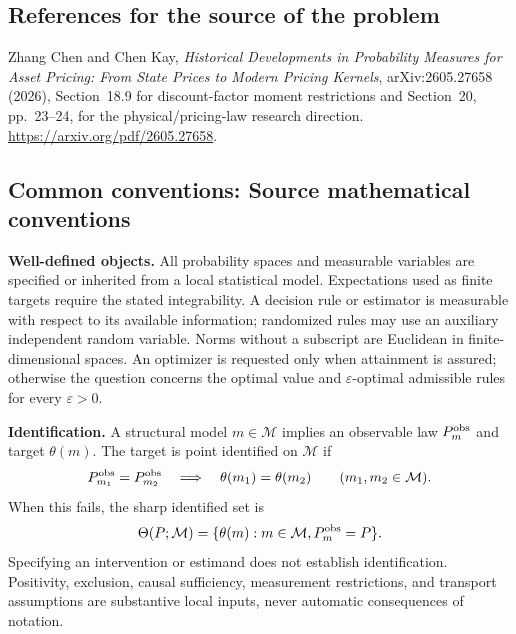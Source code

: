 \documentclass[11pt,a4paper]{article}
\begin{document}
\subsection*{References for the source of the problem}
Zhang Chen and Chen Kay, \emph{Historical Developments in Probability Measures for Asset Pricing: From State Prices to Modern Pricing Kernels}, arXiv:2605.27658 (2026), Section~18.9 for discount-factor moment restrictions and Section~20, pp.~23--24, for the physical/pricing-law research direction. \url{https://arxiv.org/pdf/2605.27658}.

\subsection*{Common conventions: Source mathematical conventions}

\textbf{Well-defined objects.}
All probability spaces and measurable variables are specified or inherited
from a local statistical model. Expectations used as finite targets require
the stated integrability. A decision rule or estimator is measurable with
respect to its available information; randomized rules may use an auxiliary
independent random variable. Norms without a subscript are Euclidean in
finite-dimensional spaces. An optimizer is requested only when attainment
is assured; otherwise the question concerns the optimal value and
$\varepsilon$-optimal admissible rules for every $\varepsilon>0$.

\textbf{Identification.}
A structural model $m\in\mathcal M$ implies an observable law
$P_m^{\rm obs}$ and target $\theta(m)$. The target is point identified on
$\mathcal M$ if
\[
 P_{m_1}^{\rm obs}=P_{m_2}^{\rm obs}
 \quad\Longrightarrow\quad\theta(m_1)=\theta(m_2)
 \qquad(m_1,m_2\in\mathcal M).
\]
When this fails, the sharp identified set is
\[
 \Theta(P;\mathcal M)=\{\theta(m):m\in\mathcal M,
                                  P_m^{\rm obs}=P\}.
\]
Specifying an intervention or estimand does not establish identification.
Positivity, exclusion, causal sufficiency, measurement restrictions, and
transport assumptions are substantive local inputs, never automatic
consequences of notation.
\end{document}
